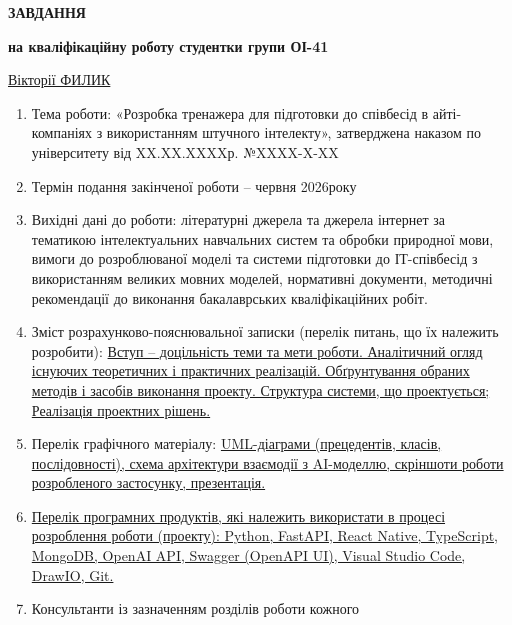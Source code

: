 \textbf{ЗАВДАННЯ}

\textbf{на кваліфікаційну роботу студентки групи ОІ-41}

\ul{Вікторії ФИЛИК}

\begin{enumerate}
\def\labelenumi{\arabic{enumi}.}
\item
  Тема роботи: «Розробка тренажера для підготовки до співбесід в
  айті-компаніях з використанням штучного інтелекту», затверджена
  наказом по університету від XX.XX.XXXXр. №XXXX-X-XX
\item
  Термін подання закінченої роботи -- червня 2026року
\item
  Вихідні дані до роботи: літературні джерела та джерела інтернет за
  тематикою інтелектуальних навчальних систем та обробки природної мови,
  вимоги до розроблюваної моделі та системи підготовки до ІТ-співбесід з
  використанням великих мовних моделей, нормативні документи, методичні
  рекомендації до виконання бакалаврських кваліфікаційних робіт.
\item
  Зміст розрахунково-пояснювальної записки (перелік питань, що їх
  належить розробити): \ul{Вступ -- доцільність теми та мети роботи.
  Аналітичний огляд існуючих теоретичних і практичних реалізацій.
  Обґрунтування обраних методів і засобів виконання проекту. Структура
  системи, що проектується; Реалізація проектних рішень.}
\item
  Перелік графічного матеріалу: \ul{UML-діаграми (прецедентів, класів,
  послідовності), схема архітектури взаємодії з AI-моделлю, скріншоти
  роботи розробленого застосунку, презентація.}
\item
  \ul{Перелік програмних продуктів, які належить використати в процесі
  розроблення роботи (проекту): Python, FastAPI, React Native,
  TypeScript, MongoDB, OpenAI API, Swagger (OpenAPI UI), Visual Studio
  Code, DrawIO, Git.}
\item
  Консультанти із зазначенням розділів роботи кожного
\end{enumerate}

